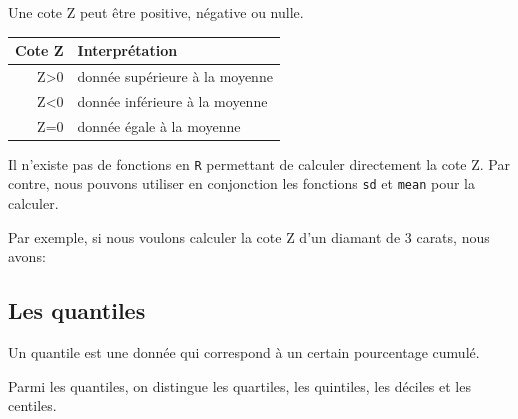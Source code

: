 \documentclass[]{book}
\newenvironment{Shaded}{\begin{snugshade}}{\end{snugshade}}
\newcommand{\DecValTok}[1]{\textcolor[rgb]{0.00,0.00,0.81}{#1}}
\newcommand{\KeywordTok}[1]{\textcolor[rgb]{0.13,0.29,0.53}{\textbf{#1}}}
\newcommand{\NormalTok}[1]{#1}
\newcommand{\OperatorTok}[1]{\textcolor[rgb]{0.81,0.36,0.00}{\textbf{#1}}}
\theoremstyle{definition}
\theoremstyle{definition}
\theoremstyle{definition}
\theoremstyle{remark}
\begin{document}
Une cote Z peut être positive, négative ou nulle.

\begin{longtable}[]{@{}rl@{}}
\toprule
Cote Z & Interprétation\tabularnewline
\midrule
\endhead
Z\textgreater{}0 & donnée supérieure à la moyenne\tabularnewline
Z\textless{}0 & donnée inférieure à la moyenne\tabularnewline
Z=0 & donnée égale à la moyenne\tabularnewline
\bottomrule
\end{longtable}

Il n'existe pas de fonctions en \texttt{R} permettant de calculer
directement la cote Z. Par contre, nous pouvons utiliser en conjonction
les fonctions \texttt{sd} et \texttt{mean} pour la calculer.

Par exemple, si nous voulons calculer la cote Z d'un diamant de 3
carats, nous avons:

\begin{Shaded}
\end{Shaded}

\hypertarget{les-quantiles}{%
\subsection{Les quantiles}\label{les-quantiles}}

Un quantile est une donnée qui correspond à un certain pourcentage
cumulé.

Parmi les quantiles, on distingue les quartiles, les quintiles, les
déciles et les centiles.
\end{document}
